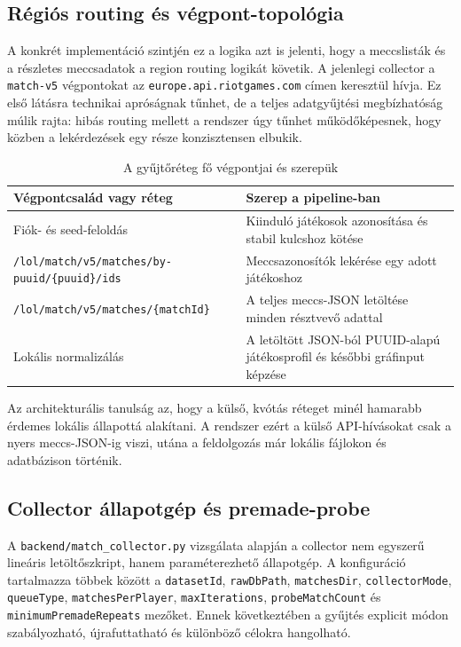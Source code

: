 ﻿\documentclass[a4paper,12pt]{report}
\begin{document}
\subsection{Régiós routing és végpont-topológia}

A konkrét implementáció szintjén ez a logika azt is jelenti, hogy a meccslisták és a részletes meccsadatok a region routing logikát követik. A jelenlegi collector a \texttt{match-v5} végpontokat az \texttt{europe.api.riotgames.com} címen keresztül hívja. Ez első látásra technikai apróságnak tűnhet, de a teljes adatgyűjtési megbízhatóság múlik rajta: hibás routing mellett a rendszer úgy tűnhet működőképesnek, hogy közben a lekérdezések egy része konzisztensen elbukik.

\begin{table}[H]
\centering
\caption{A gyűjtőréteg fő végpontjai és szerepük}
\begin{tabularx}{\textwidth}{>{\raggedright\arraybackslash}p{4.4cm}X}
\toprule
\textbf{Végpontcsalád vagy réteg} & \textbf{Szerep a pipeline-ban} \\
\midrule
Fiók- és seed-feloldás & Kiinduló játékosok azonosítása és stabil kulcshoz kötése \\
\texttt{/lol/match/v5/matches/by-puuid/\{puuid\}/ids} & Meccsazonosítók lekérése egy adott játékoshoz \\
\texttt{/lol/match/v5/matches/\{matchId\}} & A teljes meccs-JSON letöltése minden résztvevő adattal \\
Lokális normalizálás & A letöltött JSON-ból PUUID-alapú játékosprofil és későbbi gráfinput képzése \\
\bottomrule
\end{tabularx}
\end{table}

Az architekturális tanulság az, hogy a külső, kvótás réteget minél hamarabb érdemes lokális állapottá alakítani. A rendszer ezért a külső API-hívásokat csak a nyers meccs-JSON-ig viszi, utána a feldolgozás már lokális fájlokon és adatbázison történik.

\subsection{Collector állapotgép és premade-probe}

A \texttt{backend/match\_collector.py} vizsgálata alapján a collector nem egyszerű lineáris letöltőszkript, hanem paraméterezhető állapotgép. A konfiguráció tartalmazza többek között a \texttt{datasetId}, \texttt{rawDbPath}, \texttt{matchesDir}, \texttt{collectorMode}, \texttt{queueType}, \texttt{matchesPerPlayer}, \texttt{maxIterations}, \texttt{probeMatchCount} és \texttt{minimumPremadeRepeats} mezőket. Ennek következtében a gyűjtés explicit módon szabályozható, újrafuttatható és különböző célokra hangolható.
\end{document}
